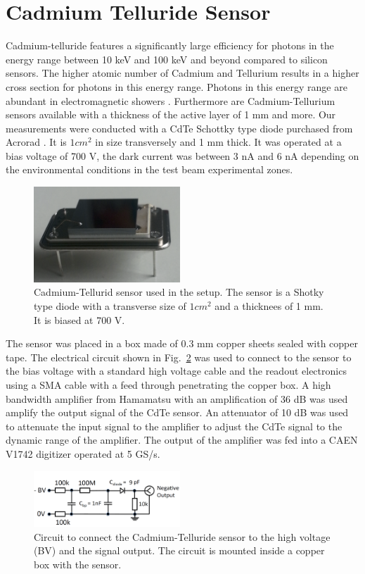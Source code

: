 %
%
%
\section{Cadmium Telluride Sensor}
\label{sec:siliconpad}

Cadmium-telluride features a significantly large efficiency for photons in the energy range between 10 keV and 100 keV and beyond compared to silicon sensors. The higher atomic number of Cadmium and Tellurium results in a higher cross section for photons in this energy range. 
Photons in this energy range are abundant in electromagnetic showers \cite{showercomposition}. 
Furthermore are Cadmium-Tellurium sensors available with a thickness of the active layer of 1 mm and more.  
%
Our measurements were conducted with a CdTe Schottky type diode purchased from Acrorad \cite{acrorad}. It is $1 cm^2$ in size transversely and 1 mm thick.
It was operated at a bias voltage of 700 V, the dark current was between 3 nA and 6 nA depending on the environmental conditions in the test beam experimental zones.     
%
\begin{figure}[htbp] 
\centering
\includegraphics[width=0.49\textwidth]{figures/CdTeSensor.png} 
\caption{Cadmium-Tellurid sensor used in the setup. The sensor is a Shotky type diode with a transverse size of $1 cm^2$ and a thicknees of 1 mm. It is biased at 700 V.} 
\label{fig:CdTeSensor} 
\end{figure} 
%
The sensor was placed in a box made of 0.3 mm copper sheets sealed with copper tape. 
The electrical circuit shown in Fig.~\ref{fig:cdtecircuit} was used to connect to the sensor to the bias voltage with a standard high voltage cable and the readout electronics using a SMA cable with a feed through penetrating the copper box.
A high bandwidth amplifier from Hamamatsu with an amplification of 36 dB was used amplify the output signal of the CdTe sensor.
An attenuator of 10 dB was used to attenuate the input signal to the amplifier to adjust the CdTe signal to the dynamic range of the amplifier.
The output of the amplifier was fed into a CAEN V1742 digitizer operated at 5 GS/s.
%
\begin{figure}[htbp] 
\centering
\includegraphics[width=0.49\textwidth]{figures/circuit_CdTe.png} 
\caption{Circuit to connect the Cadmium-Telluride sensor to the high voltage (BV) and the signal output. The circuit is mounted inside a copper box with the sensor.} 
\label{fig:cdtecircuit} 
\end{figure} 
%

